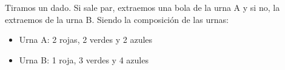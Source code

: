 \documentclass[addpoints,spanish, 12pt,a4paper]{exam}
\begin{document}
\begin{questions}




\question[1] Tiramos un dado. Si sale par, extraemos una bola de la urna A y si no, la extraemos de la urna B. Siendo la composición de las urnas:
\begin{itemize}
\item Urna A: 2 rojas, 2 verdes y 2 azules
\item Urna B: 1 roja, 3 verdes y 4 azules
\end{itemize}


\end{questions}
\end{document}
